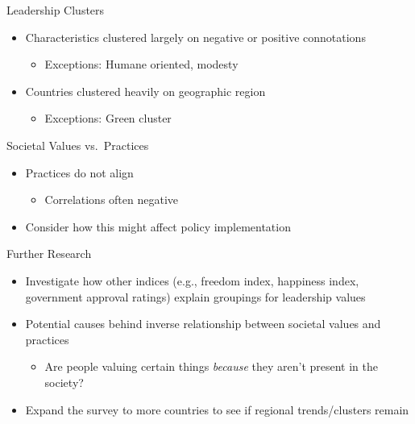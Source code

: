 \documentclass[
  ignorenonframetext,
]{beamer}
\providecommand{\tightlist}{%
  \setlength{\itemsep}{0pt}\setlength{\parskip}{0pt}}
\begin{document}
\begin{frame}{Leadership Clusters}
\protect\hypertarget{leadership-clusters-1}{}

\begin{itemize}
\tightlist
\item
  Characteristics clustered largely on negative or positive connotations

  \begin{itemize}
  \tightlist
  \item
    Exceptions: \textcolor{clust2}{Humane oriented, modesty}
  \end{itemize}
\item
  Countries clustered heavily on geographic region

  \begin{itemize}
  \tightlist
  \item
    Exceptions: \textcolor{clust6}{Green cluster}
  \end{itemize}
\end{itemize}
\end{frame}

\begin{frame}{Societal Values vs.~Practices}
\protect\hypertarget{societal-values-vs.-practices}{}
\begin{itemize}
\tightlist
\item
  Practices do not align

  \begin{itemize}
  \tightlist
  \item
    Correlations often negative
  \end{itemize}
\item
  Consider how this might affect policy implementation
\end{itemize}
\end{frame}

\begin{frame}{Further Research}
\protect\hypertarget{further-research}{}
\begin{itemize}
\tightlist
\item
  Investigate how other indices (e.g., freedom index, happiness index,
  government approval ratings) explain groupings for leadership values
\item
  Potential causes behind inverse relationship between societal values
  and practices

  \begin{itemize}
  \tightlist
  \item
    Are people valuing certain things \emph{because} they aren't present
    in the society?
  \end{itemize}
\item
  Expand the survey to more countries to see if regional trends/clusters
  remain
\end{itemize}
\end{frame}
\end{document}
